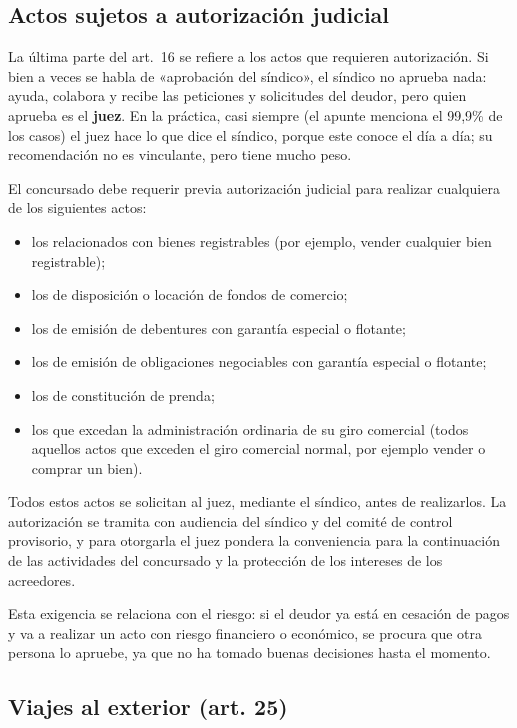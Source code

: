 \documentclass[12pt,oneside]{book}
\begin{document}
\subsection{Actos sujetos a autorización judicial}

La última parte del art.~16 se refiere a los actos que requieren autorización. Si bien a veces se habla de «aprobación del síndico», el síndico no aprueba nada: ayuda, colabora y recibe las peticiones y solicitudes del deudor, pero quien aprueba es el \textbf{juez}. En la práctica, casi siempre (el apunte menciona el 99,9\% de los casos) el juez hace lo que dice el síndico, porque este conoce el día a día; su recomendación no es vinculante, pero tiene mucho peso.

El concursado debe requerir previa autorización judicial para realizar cualquiera de los siguientes actos:
\begin{itemize}
    \item los relacionados con bienes registrables (por ejemplo, vender cualquier bien registrable);
    \item los de disposición o locación de fondos de comercio;
    \item los de emisión de debentures con garantía especial o flotante;
    \item los de emisión de obligaciones negociables con garantía especial o flotante;
    \item los de constitución de prenda;
    \item los que excedan la administración ordinaria de su giro comercial (todos aquellos actos que exceden el giro comercial normal, por ejemplo vender o comprar un bien).
\end{itemize}

Todos estos actos se solicitan al juez, mediante el síndico, antes de realizarlos. La autorización se tramita con audiencia del síndico y del comité de control provisorio, y para otorgarla el juez pondera la conveniencia para la continuación de las actividades del concursado y la protección de los intereses de los acreedores.

Esta exigencia se relaciona con el riesgo: si el deudor ya está en cesación de pagos y va a realizar un acto con riesgo financiero o económico, se procura que otra persona lo apruebe, ya que no ha tomado buenas decisiones hasta el momento.

\subsection{Viajes al exterior (art. 25)}
\end{document}

